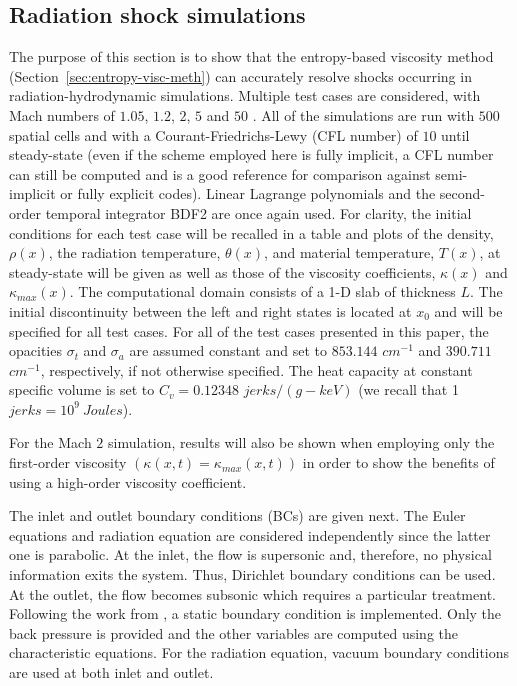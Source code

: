 \documentclass[review]{elsarticle}
\newcommand{\sect}[1]{Section~\ref{#1}}                     %
\begin{document}
\subsection{Radiation shock simulations}
\label{sec:simulations}

The purpose of this section is to show that the entropy-based viscosity method (\sect{sec:entropy-visc-meth}) can accurately resolve shocks occurring in radiation-hydrodynamic simulations. Multiple test cases are considered, with Mach numbers of $1.05$, $1.2$, $2$, $5$ and $50$ \cite{LowrieEdwards}. All of the simulations are run with $500$ spatial cells and with a Courant-Friedrichs-Lewy (CFL number) of $10$ until steady-state (even if the scheme employed here is fully implicit, a CFL number can still be computed and is a good reference for comparison against semi-implicit or fully explicit codes). Linear Lagrange polynomials and the second-order temporal integrator BDF2 are once again used. For clarity, the initial conditions for each test case will be recalled in a table and plots of the density, $\rho (x)$, the radiation temperature, $\theta (x)$, and material temperature, $T(x)$,  at steady-state will be given as well as those of the viscosity coefficients, $\kappa(x)$ and $\kappa_{max}(x)$. The computational domain consists of a 1-D slab of thickness $L$. The initial discontinuity between the left and right states is located at $x_0$ and will be specified for all test cases. For all of the test cases presented in this paper, the opacities $\sigma_t$ and $\sigma_a$ are assumed constant and set to $853.144$ $cm^{-1}$ and $390.711$ $cm^{-1}$, respectively, if not otherwise specified. The heat capacity at constant specific volume is set to $C_v = 0.12348$ $jerks/(g-keV)$ (we recall that 1 $jerks = 10^9\ Joules$).

For the Mach $2$ simulation, results will also be shown when employing only the first-order viscosity $(\kappa(x,t) = \kappa_{max}(x,t))$ in order to show the benefits of using a high-order viscosity coefficient. 

The inlet and outlet boundary conditions (BCs) are given next. The Euler equations and radiation equation are considered independently since the latter one is parabolic. At the inlet, the flow is supersonic and, therefore, no physical information exits the system. Thus, Dirichlet boundary conditions can be used. At the outlet, the flow becomes subsonic which requires a particular treatment. Following the work from \cite{SEM}, a static boundary condition is implemented. Only the back pressure is provided and the other variables are computed using the characteristic equations. For the radiation equation, vacuum boundary conditions are used at both inlet and outlet.
\end{document}
